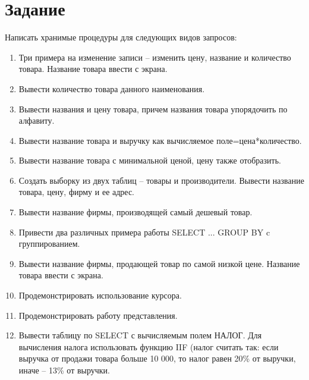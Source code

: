 \section{Задание}

Написать хранимые процедуры для следующих видов запросов:
\begin{enumerate}
\item Три примера на изменение записи – изменить цену, название и количество товара. 
Название товара ввести с экрана.
\item Вывести количество товара данного наименования.
\item Вывести названия и цену товара, причем названия товара упорядочить по алфавиту.
\item Вывести название товара и выручку как вычисляемое поле=цена*количество.
\item Вывести название товара с минимальной ценой, цену также отобразить.
\item Создать выборку из двух таблиц – товары и производители. Вывести
название товара, цену, фирму и ее адрес.
\item Вывести название фирмы, производящей самый дешевый товар.
\item Привести два различных примера работы SELECT ... GROUP BY c группированием.
\item Вывести название фирмы, продающей товар по самой низкой цене.
Название товара ввести с экрана.
\item Продемонстрировать использование курсора.
\item Продемонстрировать работу представления.
\item Вывести таблицу по SELECT с вычисляемым полем НАЛОГ.
Для вычисления налога использовать функцию IIF (налог считать так: если выручка от
продажи товара больше 10 000, то налог равен 20\% от выручки, иначе – 13\% от
выручки.
\end{enumerate}

\clearpage